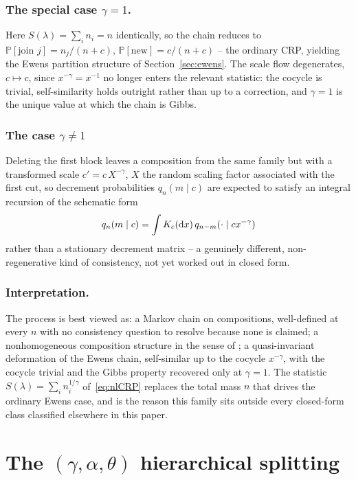 \documentclass[11pt]{article}
\newcommand{\PP}{\mathbb{P}}
\theoremstyle{plain}
\theoremstyle{definition}
\begin{document}
\subsubsection{The special case \(\gamma=1\).} Here \(S(\lambda)=\sum_in_i=n\) identically, so the chain reduces to \(\PP[\text{join }j]=n_j/(n+c)\), \(\PP[\text{new}]=c/(n+c)\) -- the ordinary CRP, yielding the Ewens partition structure of Section~\ref{sec:ewens}. The scale flow degenerates, \(c\mapsto c\), since \(x^{-\gamma}=x^{-1}\) no longer enters the relevant statistic: the cocycle is trivial, self-similarity holds outright rather than up to a correction, and \(\gamma=1\) is the unique value at which the chain is Gibbs.

\subsubsection{The case \(\gamma\neq1\)} Deleting the first block leaves a composition from the same family but with a transformed scale \(c'=c\,X^{-\gamma}\), \(X\) the random scaling factor associated with the first cut, so decrement probabilities \(q_n(m\mid c)\) are expected to satisfy an integral recursion of the schematic form
\[
q_n(m\mid c)=\int K_c({\rm d}x)\,q_{n-m}(\cdot\mid cx^{-\gamma})
\]
rather than a stationary decrement matrix -- a genuinely different, non-regenerative kind of consistency, not yet worked out in closed form.

\subsubsection{Interpretation.} The process is best viewed as: a Markov chain on compositions, well-defined at every \(n\) with no consistency question to resolve because none is claimed; a nonhomogeneous composition structure in the sense of \cite{PitmanTran2015}; a quasi-invariant deformation of the Ewens chain, self-similar up to the cocycle \(x^{-\gamma}\), with the cocycle trivial and the Gibbs property recovered only at \(\gamma=1\). The statistic \(S(\lambda)=\sum_in_i^{1/\gamma}\) of~\eqref{eq:nlCRP} replaces the total mass \(n\) that drives the ordinary Ewens case, and is the reason this family sits outside every closed-form class classified elsewhere in this paper.

\section{The \((\gamma,\alpha,\theta)\) hierarchical splitting}
\label{sec:power-product}
\end{document}
